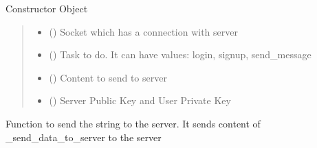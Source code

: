 \documentclass[letterpaper,10pt,english]{sphinxmanual}
\begin{document}
\begin{fulllineitems}
\begin{quote}
\begin{description}
\end{description}\end{quote}

\sphinxAtStartPar
Constructor Object
\begin{quote}\begin{description}
\begin{itemize}
\item {} 
\sphinxAtStartPar
{} () \textendash{} Socket which has a connection with server

\item {} 
\sphinxAtStartPar
{} () \textendash{} Task to do. It can have values: login, signup, send\_message

\item {} 
\sphinxAtStartPar
{} () \textendash{} Content to send to server

\item {} 
\sphinxAtStartPar
{} () \textendash{} Server Public Key and User Private Key

\end{itemize}

\end{description}\end{quote}

\begin{fulllineitems}
\label{\detokenize{Message:Message.Message._send_data_to_server}}
\pysigstartsignatures
{}
\pysigstopsignatures
\sphinxAtStartPar
Function to send the string to the server. It sends content of \_send\_data\_to\_server to the server

\end{fulllineitems}



\end{fulllineitems}
\end{document}
